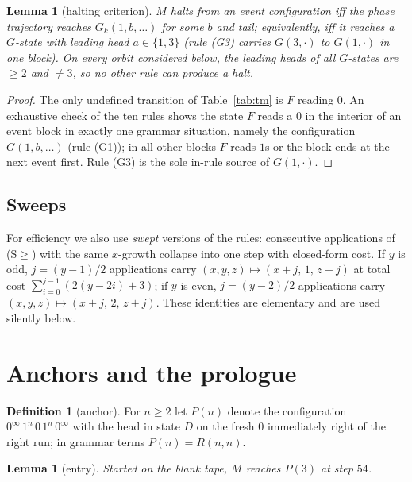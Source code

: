\documentclass[11pt]{amsart}
\newtheorem{lemma}[theorem]{Lemma}
\theoremstyle{definition}
\newtheorem{definition}[theorem]{Definition}
\begin{document}
\begin{lemma}[halting criterion]\label{lem:halt}
$M$ halts from an event configuration iff the phase trajectory reaches
$G_k(1,b,\dots)$ for some $b$ and tail; equivalently, iff it reaches a
$G$-state with leading head $a\in\{1,3\}$ (rule (G3) carries $G(3,\cdot)$
to $G(1,\cdot)$ in one block). On every orbit considered below, the
leading heads of all $G$-states are $\ge2$ and $\ne3$, so no other rule
can produce a halt.
\end{lemma}

\begin{proof}
The only undefined transition of Table~\ref{tab:tm} is $F$ reading $0$. An
exhaustive check of the ten rules shows the state $F$ reads a $0$ in the
interior of an event block in exactly one grammar situation, namely the
configuration $G(1,b,\dots)$ (rule (G1)); in all other blocks $F$ reads
$1$s or the block ends at the next event first. Rule (G3) is the sole
in-rule source of $G(1,\cdot)$.
\end{proof}

\subsection{Sweeps}

For efficiency we also use \emph{swept} versions of the rules: consecutive
applications of (S$\ge$) with the same $x$-growth collapse into one step
with closed-form cost. If $y$ is odd, $j=(y-1)/2$ applications carry
$(x,y,z)\mapsto(x+j,\,1,\,z+j)$ at total cost $\sum_{i=0}^{j-1}(2(y-2i)+3)$;
if $y$ is even, $j=(y-2)/2$ applications carry $(x,y,z)\mapsto(x+j,\,2,\,z+j)$.
These identities are elementary and are used silently below.

\section{Anchors and the prologue}\label{s:prologue}

\begin{definition}[anchor]\label{def:anchor}
For $n\ge2$ let $P(n)$ denote the configuration
$0^\infty\,1^n\,0\,1^n\,0^\infty$ with the head in state $D$ on the fresh
$0$ immediately right of the right run; in grammar terms $P(n)=R(n,n)$.
\end{definition}

\begin{lemma}[entry]\label{lem:entry}
Started on the blank tape, $M$ reaches $P(3)$ at step $54$.
\end{lemma}
\end{document}
